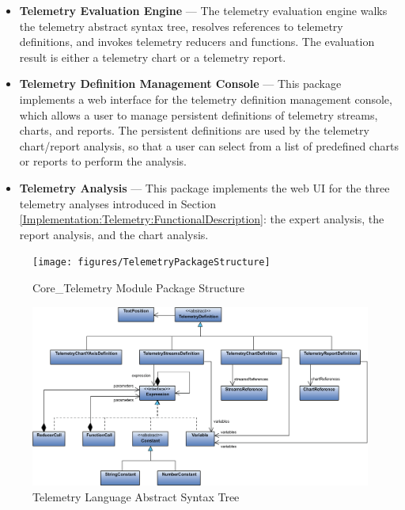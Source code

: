 \begin{itemize}
	\item \textbf{Telemetry Evaluation Engine} ---
The telemetry evaluation engine walks the telemetry abstract syntax tree, resolves references to telemetry definitions, and invokes telemetry reducers and functions. The evaluation result is either a telemetry chart or a telemetry report.
	
	\item \textbf{Telemetry Definition Management Console} ---
This package implements a web interface for the telemetry definition management console, which allows a user to manage persistent definitions of telemetry streams, charts, and reports. The persistent definitions are used by the telemetry chart/report analysis, so that a user can select from a list of predefined charts or reports to perform the analysis.

	\item \textbf{Telemetry Analysis} ---
This package implements the web UI for the three telemetry analyses introduced in Section \ref{Implementation:Telemetry:FunctionalDescription}: the expert analysis, the report analysis, and the chart analysis.
	
\end{itemize}



\begin{figure}[p]
  \texttt{[image: figures/TelemetryPackageStructure]}
  \caption{Core\_Telemetry Module Package Structure} 
  \label{fig:TelemetryPackageStructure}
\end{figure}


\begin{figure}[p]
  \includegraphics[angle=90, height=0.90\textheight]{figures/TelemetryAST}
  \caption{Telemetry Language Abstract Syntax Tree} 
  \label{fig:TelemetryAST}
\end{figure}











